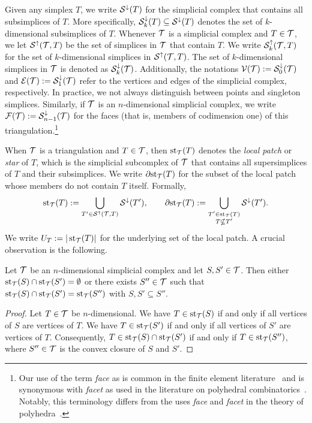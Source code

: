 \documentclass[10pt,letterpaper]{article}
\begin{document}
Given any simplex $T$, we write ${\mathcal S}^{\downarrow}(T)$ for the simplicial complex that contains all subsimplices of $T$. 
More specifically, ${\mathcal S}^{\downarrow}_{{k}}(T) \subseteq {\mathcal S}^{\downarrow}(T)$ denotes the set of $k$-dimensional subsimplices of $T$. 
Whenever ${\mathcal T}$ is a simplicial complex and $T \in {\mathcal T}$, we let ${\mathcal S}^{\uparrow}({\mathcal T},T)$ be the set of simplices in ${\mathcal T}$ that contain $T$.
We write ${\mathcal S}^{\uparrow}_{k}({\mathcal T},T)$ for the set of $k$-dimensional simplices in ${\mathcal S}^{\uparrow}({\mathcal T},T)$. 
The set of $k$-dimensional simplices in ${\mathcal T}$ is denoted as ${\mathcal S}^{\downarrow}_{{k}}({\mathcal T})$. 
Additionally, the notations ${\mathcal V}({\mathcal T}) := {\mathcal S}^{\downarrow}_{0}({\mathcal T})$ and ${\mathcal E}({\mathcal T}) := {\mathcal S}^{\downarrow}_{1}({\mathcal T})$ refer to the vertices and edges of the simplicial complex, respectively. 
In practice, we not always distinguish between points and singleton simplices. 
Similarly, if ${\mathcal T}$ is an $n$-dimensional simplicial complex, we write ${\mathcal F}({\mathcal T}) := {\mathcal S}^{\downarrow}_{n-1}({\mathcal T})$ for the faces (that is, members of codimension one) of this triangulation.\footnote{
    Our use of the term \textit{face} as is common in the finite element literature~\cite{brenner2008mathematical}
    and is synonymous with \textit{facet} as used in the literature on polyhedral combinatorics~\cite{schrijver1998theory}.
    Notably, this terminology differs from the uses \textit{face} and \textit{facet} in the theory of polyhedra~\cite{ziegler1995lectures}.
}


When ${\mathcal T}$ is a triangulation and $T \in {\mathcal T}$, then $\operatorname{st}_{{\mathcal T}}(T)$ denotes the \emph{local patch} or \textit{star} of $T$, 
which is the simplicial subcomplex of ${\mathcal T}$ that contains all supersimplices of $T$ and their subsimplices. 
We write ${\partial \rm st}_{{\mathcal T}}(T)$ for the subset of the local patch whose members do not contain $T$ itself. 
Formally,
\begin{gather*}
    \operatorname{st}_{{\mathcal T}}(T) := \bigcup_{ T' \in {\mathcal S}^{\uparrow}({\mathcal T},T) } {\mathcal S}^{\downarrow}(T'),
    \qquad 
    {\partial \rm st}_{{\mathcal T}}(T) := \bigcup_{ \substack{ T' \in \operatorname{st}_{{\mathcal T}}(T) \\ T \nsubseteq T' } } {\mathcal S}^{\downarrow}(T').
\end{gather*}
We write $U_T := | \operatorname{st}_{{\mathcal T}}(T) |$ for the underlying set of the local patch. 
A crucial observation is the following.  

\begin{lemma}
 Let ${\mathcal T}$ be an $n$-dimensional simplicial complex and let $S,S' \in {\mathcal T}$.
 Then either $\operatorname{st}_{{\mathcal T}}(S) \cap \operatorname{st}_{{\mathcal T}}(S') = \emptyset$ or there exists $S'' \in {\mathcal T}$
 such that $\operatorname{st}_{{\mathcal T}}(S) \cap \operatorname{st}_{{\mathcal T}}(S') = \operatorname{st}_{{\mathcal T}}(S'')$ with $S, S' \subseteq S''$.
\end{lemma}
\begin{proof}
 Let $T \in {\mathcal T}$ be $n$-dimensional.
 We have $T \in \operatorname{st}_{{\mathcal T}}(S )$ if and only if all vertices of $S $ are vertices of $T$.
 We have $T \in \operatorname{st}_{{\mathcal T}}(S')$ if and only if all vertices of $S'$ are vertices of $T$.
 Consequently, $T \in \operatorname{st}_{{\mathcal T}}(S) \cap \operatorname{st}_{{\mathcal T}}(S')$ if and only if $T \in \operatorname{st}_{{\mathcal T}}(S'')$,
 where $S'' \in {\mathcal T}$ is the convex closure of $S$ and $S'$.
\end{proof}
\end{document}
